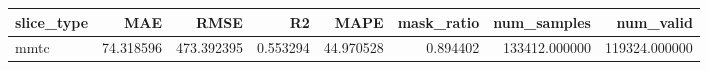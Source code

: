 \begin{tabular}{lrrrrrrr}
\toprule
slice_type & MAE & RMSE & R2 & MAPE & mask_ratio & num_samples & num_valid \\
\midrule
mmtc & 74.318596 & 473.392395 & 0.553294 & 44.970528 & 0.894402 & 133412.000000 & 119324.000000 \\
\bottomrule
\end{tabular}
